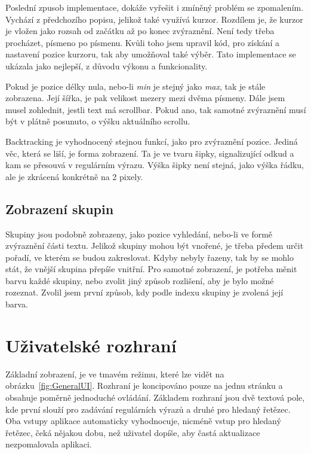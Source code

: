 Poslední zpusob implementace, dokáže vyřešit i zmíněný problém se zpomalením.
Vychází z předchozího popisu, jelikož také využívá kurzor.
Rozdílem je, že kurzor je vložen jako rozsah od začátku až po konec zvýraznění.
Není tedy třeba procházet, písmeno po písmenu.
Kvůli toho jsem upravil kód, pro získání a nastavení pozice kurzoru, tak aby umožňoval také výběr.
Tato implementace se ukázala jako nejlepší, z důvodu výkonu a funkcionality.

Pokud je pozice délky nula, nebo-li \textit{min} je stejný jako \textit{max}, tak je stále zobrazena. 
Její šířka, je pak velikost mezery mezi dvěma písmeny. 
Dále jsem musel zohlednit, jestli text má scrollbar. 
Pokud ano, tak samotné zvýraznění musí být v plátně posunuto, o výšku aktuálního scrollu.

Backtracking je vyhodnocený stejnou funkcí, jako pro zvýraznění pozice.
Jediná věc, která se liší, je forma zobrazení. 
Ta je ve tvaru šipky, signalizující odkud a kam se přesouvá v regulárním výrazu.
Výška šipky není stejná, jako výška řádku, ale je zkrácená konkrétně na 2 pixely.

\subsection*{Zobrazení skupin}

Skupiny jsou podobně zobrazeny, jako pozice vyhledání, nebo-li ve formě zvýraznění části textu.
Jelikož skupiny mohou být vnořené, je třeba předem určit pořadí, ve kterém se budou zakreslovat.
Kdyby nebyly řazeny, tak by se mohlo stát, že vnější skupina přepíše vnitřní.
Pro samotné zobrazení, je potřeba měnit barvu každé skupiny, nebo zvolit jiný způsob rozlišení, aby je bylo možné rozeznat.
Zvolil jsem první způsob, kdy podle indexu skupiny je zvolená její barva.

\section{Uživatelské rozhraní}

Základní zobrazení, je ve tmavém režimu, které lze vidět na obrázku~\ref{fig:GeneralUI}.
Rozhraní je koncipováno pouze na jednu stránku a obsahuje poměrně jednoduché ovládání.
Základem rozhraní jsou dvě textová pole, kde první slouží pro zadávání regulárních výrazů a druhé pro hledaný řetězec.
Oba vstupy aplikace automaticky vyhodnocuje, nicméně vstup pro hledaný řetězec, čeká nějakou dobu, než uživatel dopíše, aby častá aktualizace nezpomalovala aplikaci.

